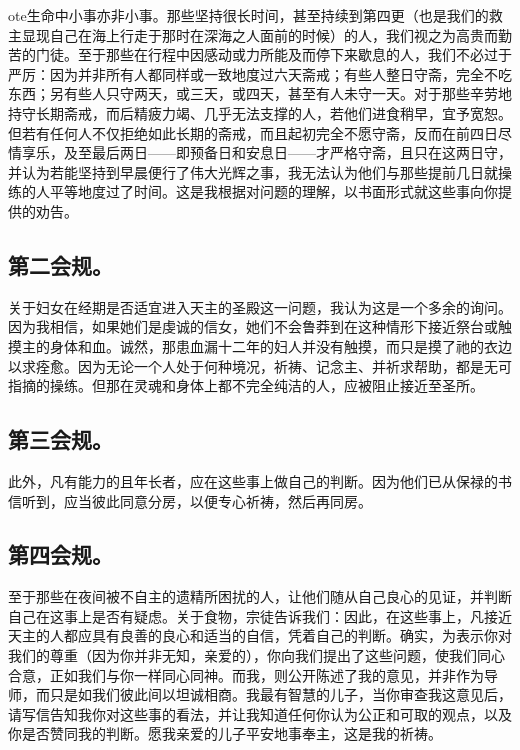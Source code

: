 ote{生命中小事亦非小事。}那些坚持很长时间，甚至持续到第四更（也是我们的救主显现自己在海上行走于那时在深海之人面前的时候）的人，我们视之为高贵而勤苦的门徒。至于那些在行程中因感动或力所能及而停下来歇息的人，我们不必过于严厉：因为并非所有人都同样或一致地度过六天斋戒；有些人整日守斋，完全不吃东西；另有些人只守两天，或三天，或四天，甚至有人未守一天。对于那些辛劳地持守长期斋戒，而后精疲力竭、几乎无法支撑的人，若他们进食稍早，宜予宽恕。但若有任何人不仅拒绝如此长期的斋戒，而且起初完全不愿守斋，反而在前四日尽情享乐，及至最后两日——即预备日和安息日——才严格守斋，且只在这两日守，并认为若能坚持到早晨便行了伟大光辉之事，我无法认为他们与那些提前几日就操练的人平等地度过了时间。这是我根据对问题的理解，以书面形式就这些事向你提供的劝告。\par


\subsection{第二会规。}

关于妇女在经期是否适宜进入天主的圣殿这一问题，我认为这是一个多余的询问。因为我相信，如果她们是虔诚的信女，她们不会鲁莽到在这种情形下接近祭台或触摸主的身体和血。诚然，那患血漏十二年的妇人并没有触摸，而只是摸了祂的衣边以求痊愈。因为无论一个人处于何种境况，祈祷、记念主、并祈求帮助，都是无可指摘的操练。但那在灵魂和身体上都不完全纯洁的人，应被阻止接近至圣所。\par


\subsection{第三会规。}

此外，凡有能力的且年长者，应在这些事上做自己的判断。因为他们已从保禄的书信听到，应当彼此同意分房，以便专心祈祷，然后再同房。\par


\subsection{第四会规。}

至于那些在夜间被不自主的遗精所困扰的人，让他们随从自己良心的见证，并判断自己在这事上是否有疑虑。关于食物，宗徒告诉我们：因此，在这些事上，凡接近天主的人都应具有良善的良心和适当的自信，凭着自己的判断。确实，为表示你对我们的尊重（因为你并非无知，亲爱的），你向我们提出了这些问题，使我们同心合意，正如我们与你一样同心同神。而我，则公开陈述了我的意见，并非作为导师，而只是如我们彼此间以坦诚相商。我最有智慧的儿子，当你审查我这意见后，请写信告知我你对这些事的看法，并让我知道任何你认为公正和可取的观点，以及你是否赞同我的判断。愿我亲爱的儿子平安地事奉主，这是我的祈祷。\par

